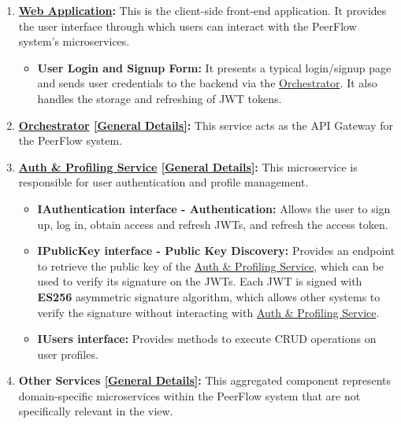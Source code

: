 \begin{enumerate}
    \item \textbf{\hyperref[def:WebApplication]{Web Application}:} This is the client-side front-end application. It provides the user interface through which users can interact with the PeerFlow system’s microservices. 
    \begin{itemize}
        \item \textbf{User Login and Signup Form:} It presents a typical login/signup page and sends user credentials to the backend via the \hyperref[def:Orchestrator]{Orchestrator}. It also handles the storage and refreshing of JWT tokens.
    \end{itemize}
    \item \textbf{\hyperref[def:Orchestrator]{Orchestrator} \hyperref[def:GenDetailsOrchestrator]{[General Details]}:} This service acts as the API Gateway for the PeerFlow system. 
    
    \item \textbf{\hyperref[def:AuthProfilingService]{Auth \& Profiling Service} \hyperref[def:GenDetailsAuth]{[General Details]}:} This microservice is responsible for user authentication and profile management.  
    \begin{itemize}
        \item \textbf{IAuthentication interface - Authentication:} Allows the user to sign up, log in, obtain access and refresh JWTs, and refresh the access token.

        \item \textbf{IPublicKey interface - Public Key Discovery:} Provides an endpoint to retrieve the public key of the \hyperref[def:AuthProfilingService]{Auth \& Profiling Service}, which can be used to verify its signature on the JWTs. Each JWT is signed with \textbf{ES256} asymmetric signature algorithm, which allows other systems to verify the signature without interacting with \hyperref[def:AuthProfilingService]{Auth \& Profiling Service}.

        \item \textbf{IUsers interface:} Provides methods to execute CRUD operations on user profiles.
    \end{itemize}
    
    \item \textbf{Other Services \hyperref[def:GenDetailsOtherServices]{[General Details]}:} This aggregated component represents domain-specific microservices within the PeerFlow system that are not specifically relevant in the view.
\end{enumerate}


